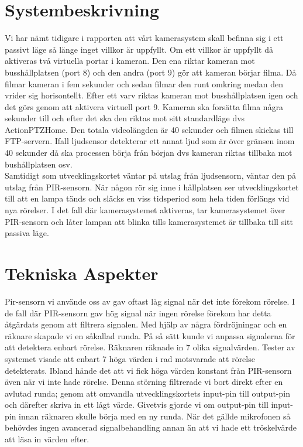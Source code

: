 \clearpage
\section{Systembeskrivning}
Vi har nämt tidigare i rapporten att vårt kamerasystem skall befinna sig i ett passivt läge så länge inget villkor är uppfyllt. Om ett villkor är uppfyllt då aktiveras två virtuella portar i kameran. Den ena riktar kameran mot busshållplatsen (port 8) och den andra (port 9) gör att kameran börjar filma. Då filmar kameran i fem sekunder och sedan filmar den runt omkring medan den vrider sig horisontellt. Efter ett varv riktas kameran mot busshållplatsen igen och det görs genom att aktivera virtuell port 9. Kameran ska forsätta filma några sekunder till och efter det ska den riktas mot sitt standardläge dvs ActionPTZHome. Den totala videolängden är 40 sekunder och filmen skickas till FTP-servern. Ifall ljudsensor detekterar ett annat ljud som är över gränsen inom 40 sekunder då ska processen börja från början dvs kameran riktas tillbaka mot bushållplatsen osv.\\
 Samtidigt som utvecklingskortet väntar på utslag från ljudsensorn, väntar den på utslag från PIR-sensorn. När någon rör sig inne i hållplatsen ser utvecklingskortet till att en lampa tänds och släcks en viss tidsperiod som hela tiden förlängs vid nya rörelser. I det fall där kamerasystemet aktiveras, tar kamerasystemet över PIR-sensorn och låter lampan att blinka tills kamerasystemet är tillbaka till sitt passiva läge.


\section{Tekniska Aspekter} 
Pir-sensorn vi använde oss av gav oftast låg signal när det inte förekom rörelse. I de fall där PIR-sensorn gav hög signal när ingen rörelse förekom har detta åtgärdats genom att filtrera signalen. Med hjälp av några fördröjningar och en räknare skapade vi en såkallad runda. På så sätt kunde vi anpassa signalerna för att detektera enbart rörelse. Räknaren räknade in 7 olika signalvärden. Tester av systemet visade att enbart 7 höga värden i rad motsvarade att rörelse detekterats. Ibland hände det att vi fick höga värden konstant från PIR-sensorn även när vi inte hade rörelse. Denna störning filtrerade vi bort direkt efter en avlutad runda; genom att omvandla utvecklingskortets input-pin till output-pin och därefter skriva in ett lågt värde. Givetvis gjorde vi om output-pin till input-pin innan räknaren skulle börja med en ny runda. När det gällde mikrofonen så behövdes ingen avancerad signalbehandling annan än att vi hade ett tröskelvärde att läsa in värden efter.

